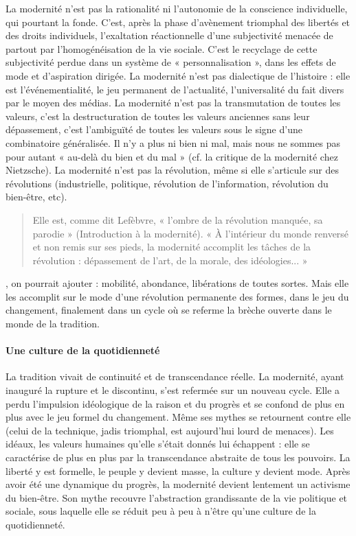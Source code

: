 La modernité n'est pas la rationalité ni l'autonomie de la conscience individuelle, qui pourtant la fonde. C'est, après la phase d'avènement triomphal des libertés et des droits individuels, l'exaltation réactionnelle d'une subjectivité menacée de partout par l'homogénéisation de la vie sociale. C'est le recyclage de cette subjectivité perdue dans un système de « personnalisation », dans les effets de mode et d'aspiration dirigée.
La modernité n'est pas dialectique de l'histoire : elle est l'événementialité, le jeu permanent de l'actualité, l'universalité du fait divers par le moyen des médias.
La modernité n'est pas la transmutation de toutes les valeurs, c'est la destructuration de toutes les valeurs anciennes sans leur dépassement, c'est l'ambiguïté de toutes les valeurs sous le signe d'une combinatoire généralisée. Il n'y a plus ni bien ni mal, mais nous ne sommes pas pour autant « au-delà du bien et du mal » (cf. la critique de la modernité chez Nietzsche).
La modernité n'est pas la révolution, même si elle s'articule sur des révolutions (industrielle, politique, révolution de l'information, révolution du bien-être, etc). \begin{quote}
    Elle est, comme dit Lefèbvre, « l'ombre de la révolution manquée, sa parodie » (Introduction à la modernité). « À l'intérieur du monde renversé et non remis sur ses pieds, la modernité accomplit les tâches de la révolution : dépassement de l'art, de la morale, des idéologies... »
\end{quote} , on pourrait ajouter :
mobilité, abondance, libérations de toutes sortes. Mais elle les accomplit sur le mode d'une révolution permanente des formes, dans le jeu du changement, finalement dans un cycle où se referme la brèche ouverte dans le monde de la tradition.
\paragraph{Une culture de la quotidienneté}

La tradition vivait de continuité et de transcendance réelle. La modernité, ayant inauguré la rupture et le discontinu, s'est refermée sur un nouveau cycle. Elle a perdu l'impulsion idéologique de la raison et du progrès et se confond de plus en plus avec le jeu formel du changement. Même ses mythes se retournent contre elle (celui de la technique, jadis triomphal, est aujourd'hui lourd de menaces). Les idéaux, les valeurs humaines qu'elle s'était donnés lui échappent : elle se caractérise de plus en plus par la transcendance abstraite de tous les pouvoirs. La liberté y est formelle, le peuple y devient masse, la culture y devient mode. Après avoir été une dynamique du progrès, la modernité devient lentement un activisme du bien-être. Son mythe recouvre l'abstraction grandissante de la vie politique et sociale, sous laquelle elle se réduit peu à peu à n'être qu'une culture de la quotidienneté.

